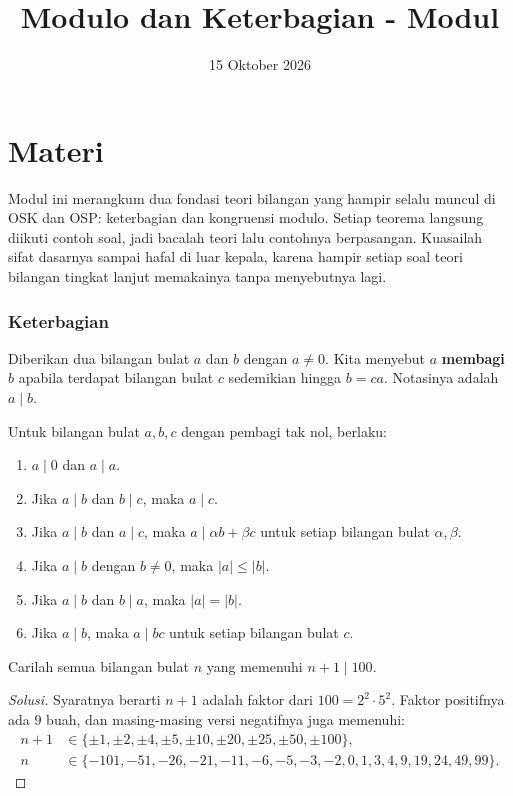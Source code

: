 \documentclass[12pt]{scrartcl}
\title{Modulo dan Keterbagian - Modul}
\date{15 Oktober 2026}
\begin{document}
\maketitle

\renewcommand*\contentsname{Daftar Isi}
\tableofcontents

\newpage

\part*{Materi}

Modul ini merangkum dua fondasi teori bilangan yang hampir selalu muncul di OSK dan OSP:
keterbagian dan kongruensi modulo. Setiap teorema langsung diikuti contoh soal,
jadi bacalah teori lalu contohnya berpasangan.
Kuasailah sifat dasarnya sampai hafal di luar kepala,
karena hampir setiap soal teori bilangan tingkat lanjut memakainya tanpa menyebutnya lagi.

\section{Keterbagian}

\begin{definition}
Diberikan dua bilangan bulat $a$ dan $b$ dengan $a \ne 0$.
Kita menyebut $a$ \textbf{membagi} $b$ apabila terdapat bilangan bulat $c$
sedemikian hingga $b = ca$. Notasinya adalah $a \mid b$.
\end{definition}

\begin{fact}
Untuk bilangan bulat $a, b, c$ dengan pembagi tak nol, berlaku:
\begin{enumerate}
    \item $a \mid 0$ dan $a \mid a$.
    \item Jika $a \mid b$ dan $b \mid c$, maka $a \mid c$.
    \item Jika $a \mid b$ dan $a \mid c$, maka
    $a \mid \alpha b + \beta c$ untuk setiap bilangan bulat $\alpha, \beta$.
    \item Jika $a \mid b$ dengan $b \ne 0$, maka $|a| \le |b|$.
    \item Jika $a \mid b$ dan $b \mid a$, maka $|a| = |b|$.
    \item Jika $a \mid b$, maka $a \mid bc$ untuk setiap bilangan bulat $c$.
\end{enumerate}
\end{fact}

\begin{example}
Carilah semua bilangan bulat $n$ yang memenuhi $n + 1 \mid 100$.
\end{example}
\begin{proof}[Solusi]
Syaratnya berarti $n + 1$ adalah faktor dari $100 = 2^2 \cdot 5^2$.
Faktor positifnya ada $9$ buah, dan masing-masing versi negatifnya juga memenuhi:
\begin{align*}
n + 1 &\in \{\pm 1, \pm 2, \pm 4, \pm 5, \pm 10, \pm 20, \pm 25, \pm 50, \pm 100\}, \\
n &\in \{-101, -51, -26, -21, -11, -6, -5, -3, -2, 0, 1, 3, 4, 9, 19, 24, 49, 99\}.
\end{align*}
\end{proof}
\end{document}
